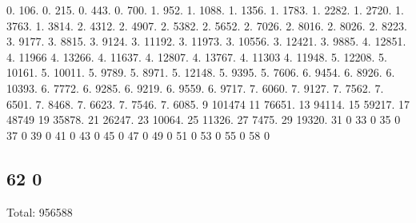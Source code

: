 0. 106. 0. 215. 0. 443. 0. 700. 1. 952. 1. 1088. 1. 1356. 1. 1783. 1. 2282. 1. 2720. 1. 3763. 1. 3814. 2. 4312. 2. 4907. 2. 5382. 2. 5652. 2. 7026. 2. 8016. 2. 8026. 2. 8223. 3. 9177. 3. 8815. 3. 9124. 3. 11192. 3. 11973. 3. 10556. 3. 12421. 3. 9885. 4. 12851. 4. 11966 4. 13266. 4. 11637. 4. 12807. 4. 13767. 4. 11303 4. 11948. 5. 12208. 5. 10161. 5. 10011. 5. 9789. 5. 8971. 5. 12148. 5. 9395. 5. 7606. 6. 9454. 6. 8926. 6. 10393. 6. 7772. 6. 9285. 6. 9219. 6. 9559. 6. 9717. 7. 6060. 7. 9127. 7. 7562. 7. 6501. 7. 8468. 7. 6623. 7. 7546. 7. 6085. 9 101474 11 76651. 13 94114. 15 59217. 17 48749 19 35878. 21 26247. 23 10064. 25 11326. 27 7475. 29 19320. 31 0 33 0 35 0 37 0 39 0 41 0 43 0 45 0 47 0 49 0 51 0 53 0 55 0 58 0 \subsection*{62 0 }

Total\+: 956588 